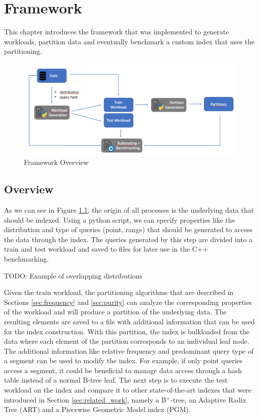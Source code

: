 \thispagestyle{plain}
\chapter{Framework}
This chapter introduces the framework that was implemented to generate workloads, partition data and eventually benchmark a custom index that uses the partitioning.
\begin{figure}[H]
    \centering
    \includegraphics[width=\textwidth]{figures/pipeline.png}
    \caption{Framework Overview}
    \label{fig:framework}
\end{figure}

\section{Overview}
As we can see in Figure \ref{fig:framework}, the origin of all processes is the underlying data that should be indexed. Using a python script, we can specify properties like the distribution and type of queries (point, range) that should be generated to access the data through the index. The queries generated by this step are divided into a train and test workload and saved to files for later use in the C++ benchmarking.

TODO: Example of overlapping distributions

Given the train workload, the partitioning algorithms that are described in Sections \ref{sec:frequency} and \ref{sec:purity} can analyze the corresponding properties of the workload and will produce a partition of the underlying data. The resulting elements are saved to a file with additional information that can be used for the index construction.
With this partition, the index is bulkloaded from the data where each element of the partition corresponds to an individual leaf node. The additional information like relative frequency and predominant query type of a segment can be used to modify the index. For example, if only point queries access a segment, it could be beneficial to manage data access through a hash table instead of a normal B-tree leaf. The next step is to execute the test workload on the index and compare it to other state-of-the-art indexes that were introduced in Section \ref{sec:related_work}, namely a B$^+$-tree, an Adaptive Radix Tree (ART) and a Piecewise Geometric Model index (PGM).

